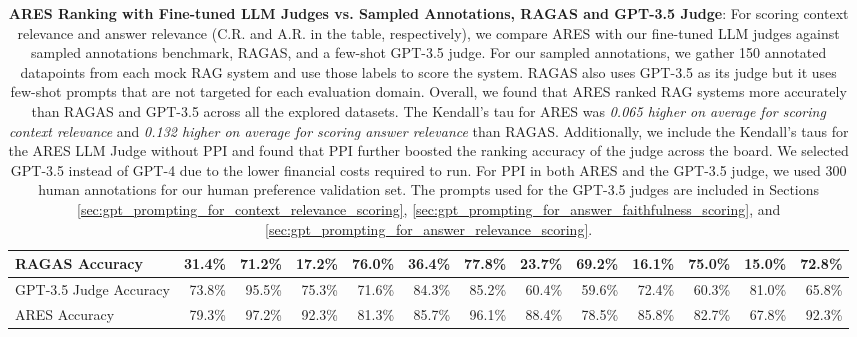 \begin{table}[ht]
\begin{tabular}{lrrrrrrrrrrrr}
RAGAS Accuracy &  31.4\% &  71.2\% & 17.2\% & 76.0\%  &36.4\%&  77.8\% &23.7\%& 69.2\%&  16.1\% &  75.0\% &  15.0\% &  72.8\%\\ \midrule
GPT-3.5 Judge Accuracy & 73.8\%& 95.5\%& 75.3\%& 71.6\%& 84.3\%& 85.2\%& 60.4\%& 59.6\%& 72.4\%& 60.3\%& 81.0\%& 65.8\% \\ \midrule
ARES Accuracy & 79.3\%& 97.2\%& 92.3\%& 81.3\%& 85.7\%& 96.1\%& 88.4\%& 78.5\%& 85.8\%& 82.7\%& 67.8\%& 92.3\% \\ \bottomrule 
\end{tabular}
\caption{\textbf{ARES Ranking with Fine-tuned LLM Judges vs. Sampled Annotations, RAGAS and GPT-3.5 Judge}: 
For scoring context relevance and answer relevance (C.R. and A.R. in the table, respectively), we compare ARES with our fine-tuned LLM judges against sampled annotations benchmark, RAGAS, %
and a few-shot GPT-3.5 judge.
For our sampled annotations, we gather 150 annotated datapoints from each mock RAG system and use those labels to score the system.
RAGAS also uses GPT-3.5 as its judge but it uses few-shot prompts that are not targeted for each evaluation domain.
Overall, we found that ARES ranked RAG systems more accurately than RAGAS and GPT-3.5 across all the explored datasets.
The Kendall's tau for ARES was \textit{0.065 higher on average for scoring context relevance} and \textit{0.132 higher on average for scoring answer relevance} than RAGAS.
Additionally, we include the Kendall's taus for the ARES LLM Judge without PPI and found that PPI further boosted the ranking accuracy of the judge across the board.
We selected GPT-3.5 instead of GPT-4 due to the lower financial costs required to run. %
For PPI in both ARES and the GPT-3.5 judge, we used 300 human annotations for our human preference validation set.
The prompts used for the GPT-3.5 judges are included in Sections \ref{sec:gpt_prompting_for_context_relevance_scoring}, \ref{sec:gpt_prompting_for_answer_faithfulness_scoring}, and \ref{sec:gpt_prompting_for_answer_relevance_scoring}.}
\label{tab:ares_vs_gpt3.5}
\end{table}

